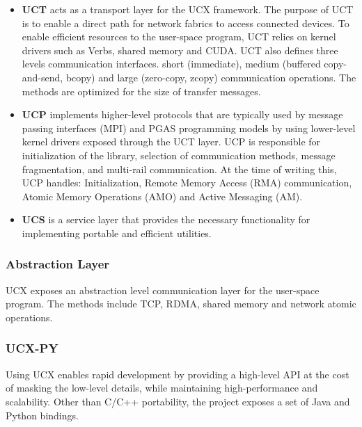 \documentclass[a4paper,onecolumn]{article}
\begin{document}
\begin{itemize}
   \item \textbf{UCT} acts as a transport layer for the UCX framework. The purpose of UCT is to enable a direct path for network fabrics to access connected devices. To enable efficient resources to the user-space program, UCT relies on kernel drivers such as Verbs, shared memory and CUDA. UCT also defines three levels communication interfaces.
   short (immediate), medium (buffered copy-and-send, bcopy) and large (zero-copy, zcopy) communication operations. The methods are optimized for the size of transfer messages.

   \item \textbf{UCP} implements higher-level protocols that are typically used by message passing interfaces (MPI) and PGAS programming models by using lower-level kernel drivers exposed through the UCT layer. UCP is responsible for initialization of the library, selection of communication methods, message fragmentation, and multi-rail communication. At the time of writing this, UCP handles: Initialization, Remote Memory Access (RMA) communication, Atomic Memory Operations (AMO) and Active Messaging (AM).
   
   \item \textbf{UCS} is a service layer that provides the necessary functionality for implementing portable and efficient utilities.
 \end{itemize}




\subsubsection{Abstraction Layer}
UCX exposes an abstraction level communication layer for the user-space program. The methods include TCP, RDMA, shared memory and network atomic operations.

\subsubsection{UCX-PY}
Using UCX enables rapid development by providing a high-level API at the cost of masking the low-level details, while maintaining high-performance and scalability. Other than C/C++ portability, the project exposes a set of Java and Python bindings. \cite{article_ucx_py}
\end{document}
